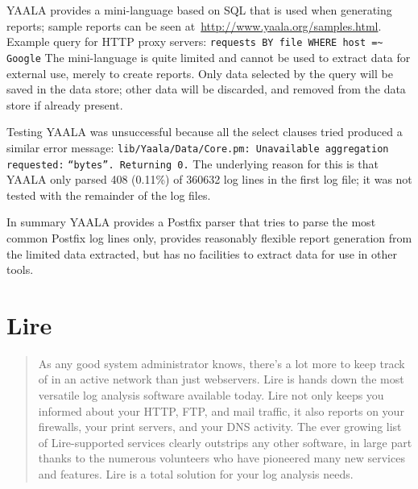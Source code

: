 YAALA provides a mini-language based on \gls{SQL} that is used when
generating reports; sample reports can be seen
at~\url{http://www.yaala.org/samples.html}.  Example query for HTTP proxy
servers: \newline{} \tab{} \texttt{requests BY file WHERE host =\~{}
Google} \newline{} The mini-language is quite limited and cannot be used to
extract data for external use, merely to create reports.  Only data
selected by the query will be saved in the data store; other data will be
discarded, and removed from the data store if already present.

Testing YAALA was unsuccessful because all the select clauses tried
produced a similar error message:
\newline{}\tab{}\texttt{lib/Yaala/Data/Core.pm: Unavailable aggregation
requested:} \newline{}\tab{}\tab{}\texttt{``bytes''. Returning 0.}
\newline{}  The underlying reason for this is that YAALA only parsed 408
(0.11\%) of 360632 log lines in the first log file; it was not tested with
the remainder of the \numberOFlogFILES{} log files.

In summary YAALA provides a Postfix parser that tries to parse the most
common Postfix log lines only, provides reasonably flexible report
generation from the limited data extracted, but has no facilities to
extract data for use in other tools.

\section{Lire}

\begin{quotation}

    As any good system administrator knows, there's a lot more to keep
    track of in an active network than just webservers. Lire is hands down
    the most versatile log analysis software available today. Lire not only
    keeps you informed about your HTTP, FTP, and mail traffic, it also
    reports on your firewalls, your print servers, and your DNS activity.
    The ever growing list of Lire-supported services clearly outstrips any
    other software, in large part thanks to the numerous volunteers who
    have pioneered many new services and features. Lire is a total solution
    for your log analysis needs.

\end{quotation}

